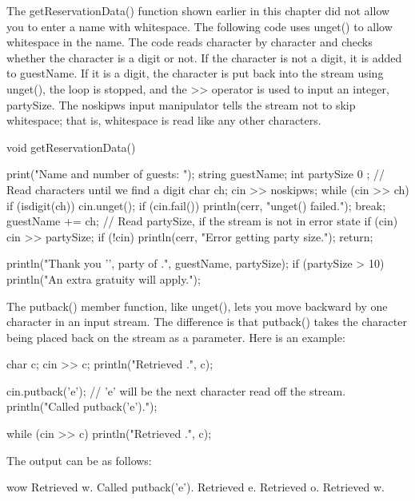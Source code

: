 The getReservationData() function shown earlier in this chapter did not allow you to enter a name with whitespace. The following code uses unget() to allow whitespace in the name. The code reads character by character and checks whether the character is a digit or not. If the character is not a digit, it is added to guestName. If it is a digit, the character is put back into the stream using unget(), the loop is stopped, and the >> operator is used to input an integer, partySize. The noskipws input manipulator tells the stream not to skip whitespace; that is, whitespace is read like any other characters.

\begin{cpp}
void getReservationData()
{
    print("Name and number of guests: ");
    string guestName;
    int partySize { 0 };
    // Read characters until we find a digit
    char ch;
    cin >> noskipws;
    while (cin >> ch) {
        if (isdigit(ch)) {
            cin.unget();
            if (cin.fail()) { println(cerr, "unget() failed."); }
            break;
        }
        guestName += ch;
    }
    // Read partySize, if the stream is not in error state
    if (cin) { cin >> partySize; }
    if (!cin) {
        println(cerr, "Error getting party size.");
        return;
    }

    println("Thank you '{}', party of {}.", guestName, partySize);
    if (partySize > 10) {
        println("An extra gratuity will apply.");
    }
}
\end{cpp}



The putback() member function, like unget(), lets you move backward by one character in an input stream. The difference is that putback() takes the character being placed back on the stream as a parameter. Here is an example:

\begin{cpp}
char c;
cin >> c;
println("Retrieved {}.", c);

cin.putback('e'); // 'e' will be the next character read off the stream.
println("Called putback('e').");

while (cin >> c) { println("Retrieved {}.", c); }
\end{cpp}

The output can be as follows:

\begin{shell}
wow
Retrieved w.
Called putback('e').
Retrieved e.
Retrieved o.
Retrieved w.
\end{shell}

